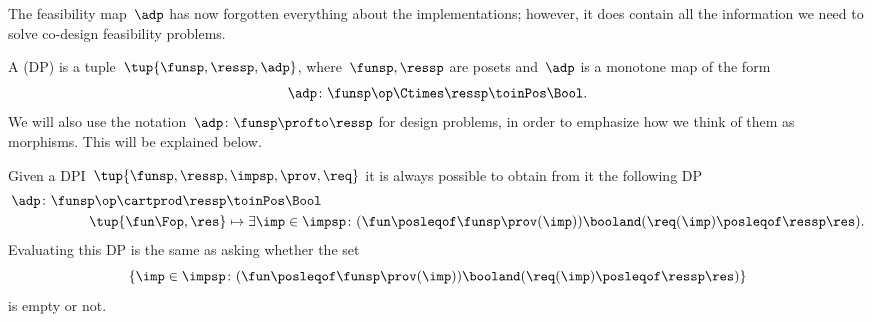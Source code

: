 The feasibility map~$\adp$ has now forgotten everything about the implementations; however, it does contain all the information we need to solve co-design feasibility problems.

\begin{definition}
    \label{def:design-problem}
    A  (DP) is a tuple~$\tup{\funsp, \ressp, \adp}$, where~$\funsp, \ressp$ are posets and~$\adp$ is a monotone map of the form%
    \begin{equation*}
        \label{eq:design_prob_as_monfun}
        \adp \colon  \funsp\op \Ctimes \ressp \toinPos \Bool.
    \end{equation*}
    We will also use the notation~$\adp \colon \funsp \profto \ressp$ for design problems, in order to emphasize how we think of them as morphisms.
    This will be explained below.
\end{definition}

\begin{remark}
    Given a DPI~$\tup{\funsp, \ressp, \impsp, \prov,\req}$ it is always possible to obtain from it the following DP
    \begin{equation}
        \label{eq:dpi_to_dp_1}
        \begin{aligned}
            \adp\colon \funsp\op \cartprod \ressp & \toinPos  \Bool                                                                                                      \\
            \tup{\fun\Fop,\res}                   & \mapsto \exists \imp \in \impsp \colon (\fun \posleqof\funsp \prov(\imp)) \booland (\req(\imp)\posleqof\ressp \res).
        \end{aligned}
    \end{equation}
    Evaluating this DP is the same as asking whether the set
    \begin{equation}
        \label{eq:dpi_to_dp_2}
        \{ \imp \in \impsp \colon (\fun \posleqof\funsp \prov(\imp)) \booland (\req(\imp)\posleqof\ressp \res)\}
    \end{equation}
    is empty or not.
\end{remark}

